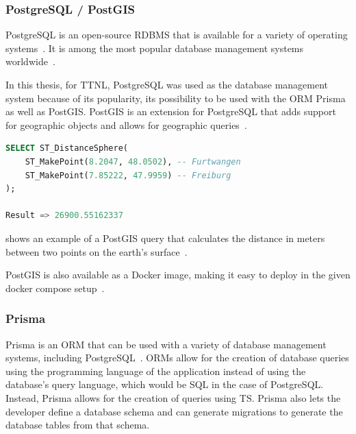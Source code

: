 \subsubsection{PostgreSQL / PostGIS}

PostgreSQL is an open-source \ac{RDBMS} that is available for a variety of operating systems~\cite{postgresql_global_development_group_postgresql_2023}.
It is among the most popular database management systems worldwide~\cite{db-engines_most_2023}.

In this thesis, for \ac{TTNL}, PostgreSQL was used as the database management system because of its popularity, its possibility to be used with the \ac{ORM} Prisma as well as PostGIS.
PostGIS is an extension for PostgreSQL that adds support for geographic objects and allows for geographic queries~\cite{postgis_psc__osgeo_postgis_2023}.

\begin{lstlisting}[language=SQL, float, caption={Example of a PostGIS query to calculate the distance between two geolocation points in meters}, label={lst:postgis-example-distance}]
SELECT ST_DistanceSphere(
    ST_MakePoint(8.2047, 48.0502), -- Furtwangen
    ST_MakePoint(7.85222, 47.9959) -- Freiburg
);

Result => 26900.55162337
\end{lstlisting}

 shows an example of a PostGIS query that calculates the distance in meters between two points on the earth's surface~\cite{noauthor_st_distancesphere_nodate}.

PostGIS is also available as a Docker image, making it easy to deploy in the given docker compose setup~\cite{docker_inc_postgispostgis_2023}.

\subsubsection{Prisma}

Prisma is an \ac{ORM} that can be used with a variety of database management systems, including PostgreSQL~\cite{prisma_data_inc_prisma_2023}.
\acp{ORM} allow for the creation of database queries using the programming language of the application instead of using the database's query language, which would be \ac{SQL} in the case of PostgreSQL.
Instead, Prisma allows for the creation of queries using \ac{TS}.
Prisma also lets the developer define a database schema and can generate migrations to generate the database tables from that schema.

